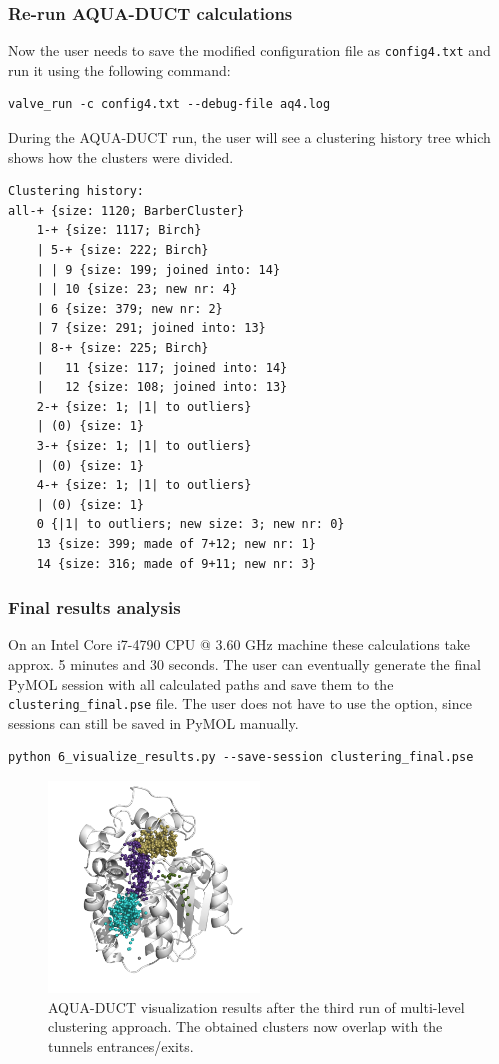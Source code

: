 \documentclass[9pt,tutorial, pubversion]{livecoms}
\begin{document}
\subsubsection{Re-run AQUA-DUCT calculations}
Now the user needs to save the modified configuration file as \texttt{config4.txt} and run it using the following command:
\begin{lstlisting}[columns=fullflexible]
valve_run -c config4.txt --debug-file aq4.log
\end{lstlisting}
During the AQUA-DUCT run, the user will see a clustering history tree which shows how the clusters were divided.
\begin{lstlisting}
Clustering history:
all-+ {size: 1120; BarberCluster}
    1-+ {size: 1117; Birch}
    | 5-+ {size: 222; Birch}
    | | 9 {size: 199; joined into: 14}
    | | 10 {size: 23; new nr: 4}
    | 6 {size: 379; new nr: 2}
    | 7 {size: 291; joined into: 13}
    | 8-+ {size: 225; Birch}
    |   11 {size: 117; joined into: 14}
    |   12 {size: 108; joined into: 13}
    2-+ {size: 1; |1| to outliers}
    | (0) {size: 1}
    3-+ {size: 1; |1| to outliers}
    | (0) {size: 1}
    4-+ {size: 1; |1| to outliers}
    | (0) {size: 1}
    0 {|1| to outliers; new size: 3; new nr: 0}
    13 {size: 399; made of 7+12; new nr: 1}
    14 {size: 316; made of 9+11; new nr: 3}
\end{lstlisting}

\subsubsection{Final results analysis}
On an Intel Core i7-4790 CPU @ 3.60 GHz machine these calculations take approx. 5 minutes and 30 seconds. The user can eventually generate the final PyMOL session with all calculated paths and save them to the \texttt{clustering\_final.pse} file. The user does not have to use the option, since sessions can still be saved in PyMOL manually.
\begin{lstlisting}
python 6_visualize_results.py --save-session clustering_final.pse
\end{lstlisting}

\begin{figure}[ht!]
\centering
\includegraphics[width=0.5\textwidth]{Tut2.3.png}
\caption{AQUA-DUCT visualization results after the third run of multi-level clustering approach. The obtained clusters now overlap with the tunnels entrances/exits.}
\label{Tut2.3}
\end{figure}
\end{document}

